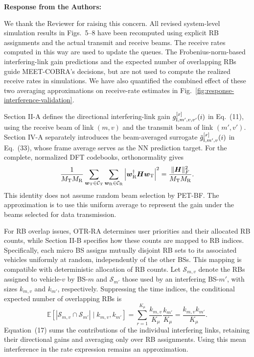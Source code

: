 \documentclass[11pt]{article}
\newenvironment{reviewedit}[1]
{\colorlet{responseblue}{#1}\colorlet{changeblue}{#1}\color{#1}}
{}
\newenvironment{authorresponse}
{\par\noindent\textcolor{responseblue}{\textbf{Response from the Authors:}}\par\color{responseblue}}
{\par}
\begin{document}
\begin{reviewedit}{blue}
\begin{authorresponse}
We thank the Reviewer for raising this concern. All revised system-level
simulation results in Figs.~5--8 have been recomputed using explicit RB assignments
and the actual transmit and receive beams. The receive rates computed in this way
are used to update the queues. The Frobenius-norm-based interfering-link gain predictions and the expected
number of overlapping RBs guide MEET-COBRA's decisions, but are not used to compute the
realized receive rates in simulations. We have also quantified the combined effect of
these two averaging approximations on receive-rate estimates in
Fig.~\ref{fig:response-interference-validation}.

Section II-A defines the directional interfering-link gain
$g_{{\rm I},m',v,v'}^{[x]}(i)$ in Eq.~(11), using the receive beam of
link $(m,v)$ and the transmit beam of link $(m',v')$.
Section IV-A separately introduces the beam-averaged surrogate
$\tilde{g}_{{\rm I},m',v}^{[x]}(i)$ in Eq.~(33), whose frame average
serves as the NN prediction target. For the complete, normalized DFT
codebooks, orthonormality gives
\[
\frac{1}{M_{\rm T}M_{\rm R}}
\sum_{\boldsymbol w_{\rm T}\in\mathcal C_{\rm T}}
\sum_{\boldsymbol w_{\rm R}\in\mathcal C_{\rm R}}
\left|\boldsymbol w_{\rm R}^{\dagger}\boldsymbol H\boldsymbol w_{\rm T}\right|^2
=\frac{\|\boldsymbol H\|_F^2}{M_{\rm T}M_{\rm R}}.
\]
This identity does not assume random beam selection by PET-BF. The
approximation is to use this uniform average to represent the gain under
the beams selected for data transmission.

For RB overlap issues, OTR-RA determines user priorities and their allocated RB counts, while
Section II-B specifies how these counts are mapped to RB indices. Specifically, each
micro BS assigns mutually disjoint RB sets to its associated vehicles uniformly at random,
independently of the other BSs. This mapping is compatible with
deterministic allocation of RB counts. Let $\mathcal S_{m,v}$ denote the
RBs assigned to vehicle-$v$ by BS-$m$ and $\mathcal S_{m'}$ those used by
an interfering BS-$m'$, with sizes $k_{m,v}$ and $k_{m'}$, respectively.
Suppressing the time indices, the conditional expected number of overlapping RBs is
\[
\mathbb E\!\left[|\mathcal S_{m,v}\cap\mathcal S_{m'}|
\mid k_{m,v},k_{m'}\right]
=\sum_{r=1}^{K_\mu}\frac{k_{m,v}}{K_\mu}\frac{k_{m'}}{K_\mu}
=\frac{k_{m,v}k_{m'}}{K_\mu}.
\]
Equation~(17) sums the contributions of the individual interfering links,
retaining their directional gains and averaging only over RB assignments.
Using this mean interference in the rate expression remains an approximation.


\end{authorresponse}
\end{reviewedit}
\end{document}
